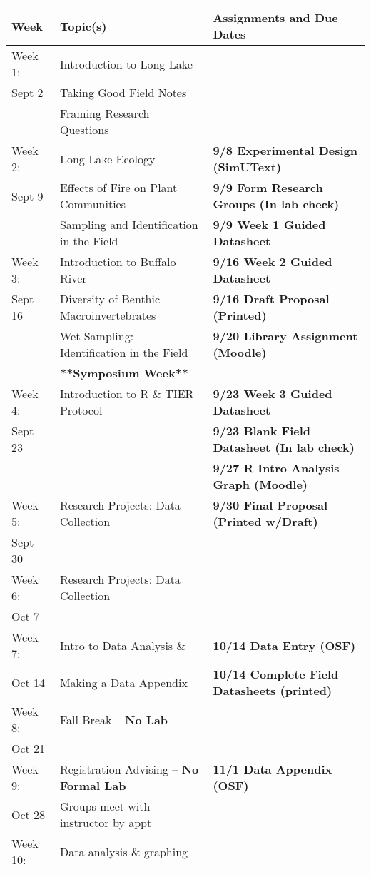 \documentclass{tufte-handout}
\begin{document}
\begin{tabular}{l l l}
Week & Topic(s) & Assignments and Due Dates \\
\hline
Week 1: & Introduction to Long Lake &  \\ 
Sept 2 & Taking Good Field Notes \\
& Framing Research Questions \\
\hline
Week 2: & Long Lake Ecology & \textbf{9/8 Experimental Design (SimUText)}\\
Sept 9 & Effects of Fire on Plant Communities &\textbf{9/9 Form Research Groups (In lab check)} \\
& Sampling and Identification in the Field &  \textbf{9/9 Week 1 Guided Datasheet}\\
\hline
Week 3: & Introduction to Buffalo River & \textbf{9/16 Week 2 Guided Datasheet} \\
Sept 16 & Diversity of Benthic Macroinvertebrates & \textbf{9/16 Draft Proposal (Printed)} \\
& Wet Sampling: Identification in the Field  & \textbf{9/20 Library Assignment (Moodle)}\\
 & \textbf{**Symposium Week**} \\
\hline
Week 4: & Introduction to R \& TIER Protocol & \textbf{9/23 Week 3 Guided Datasheet}  \\
Sept 23 &  & \textbf{9/23 Blank Field Datasheet (In lab check)} \\
 & &  \textbf{9/27 R Intro Analysis Graph (Moodle)}\\
\hline
Week 5: & Research Projects: Data Collection & \textbf{9/30 Final Proposal (Printed w/Draft)}\\
Sept 30 & & \\
\hline 
Week 6: & Research Projects: Data Collection &  \\
Oct 7 & \\
\hline 
Week 7: & Intro to Data Analysis \& &  \textbf{10/14 Data Entry (OSF)} \\
Oct 14 & Making a Data Appendix & \textbf{10/14 Complete Field Datasheets (printed)}\\
\hline
Week 8: & Fall Break -- \textbf{No Lab} & \\
Oct 21 & \\
\hline 
Week 9: & Registration Advising -- \textbf{No Formal Lab} & \textbf{11/1 Data Appendix (OSF)} \\
Oct 28 & Groups meet with instructor by appt \\
\hline 
Week 10: & Data analysis \& graphing &  \\

\end{tabular}
\end{document}
